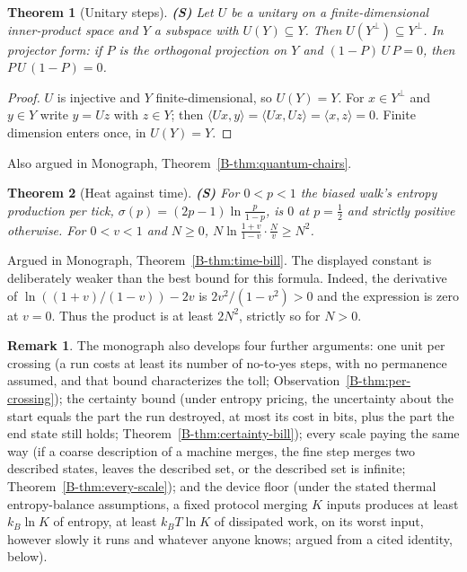 \documentclass[11pt, a4paper]{report}
\theoremstyle{definition}
\newtheorem{remark}{Remark}[chapter]
\theoremstyle{plain}
\newtheorem{theorem}{Theorem}[chapter]
\begin{document}
\begin{theorem}[Unitary steps] \textbf{(S)}
Let $U$ be a unitary on a finite-dimensional inner-product space and $Y$ a subspace with $U(Y) \subseteq Y$. Then $U(Y^\perp) \subseteq Y^\perp$. In projector form: if $P$ is the orthogonal projection on $Y$ and $(1 - P)\,U\,P = 0$, then $P\,U\,(1 - P) = 0$.
\end{theorem}
\begin{proof}
$U$ is injective and $Y$ finite-dimensional, so $U(Y) = Y$. For $x \in Y^\perp$ and $y \in Y$ write
$y = Uz$ with $z \in Y$; then $\langle Ux, y\rangle = \langle Ux, Uz\rangle = \langle x, z\rangle = 0$.
Finite dimension enters once, in $U(Y) = Y$.
\end{proof}
\noindent Also argued in Monograph, Theorem~\ref{B-thm:quantum-chairs}.

\begin{theorem}[Heat against time] \textbf{(S)}
For $0 < p < 1$ the biased walk's entropy production per tick, $\sigma(p) = (2p-1)\ln\frac{p}{1-p}$, is $0$ at $p = \tfrac12$ and strictly positive otherwise. For $0 < v < 1$ and $N \ge 0$, $N\ln\frac{1+v}{1-v} \cdot \frac{N}{v} \ge N^2$.
\end{theorem}
\noindent Argued in Monograph, Theorem~\ref{B-thm:time-bill}.
The displayed constant is deliberately weaker than the best bound for this
formula. Indeed, the derivative of
$\ln((1+v)/(1-v))-2v$ is $2v^2/(1-v^2)>0$ and the expression is zero
at $v=0$. Thus the product is at least $2N^2$, strictly so for $N>0$.


\begin{remark}
The monograph also develops four further arguments: one unit per crossing (a run costs at least its number of no-to-yes steps, with no permanence assumed, and that bound characterizes the toll; Observation~\ref{B-thm:per-crossing}); the certainty bound (under entropy pricing, the uncertainty about the start equals the part the run destroyed, at most its cost in bits, plus the part the end state still holds; Theorem~\ref{B-thm:certainty-bill}); every scale paying the same way (if a coarse description of a machine merges, the fine step merges two described states, leaves the described set, or the described set is infinite; Theorem~\ref{B-thm:every-scale}); and the device floor (under the stated thermal entropy-balance assumptions, a fixed protocol merging $K$ inputs produces at least $k_B\ln K$ of entropy, at least $k_B T\ln K$ of dissipated work, on its worst input, however slowly it runs and whatever anyone knows; argued from a cited identity, below).
\end{remark}
\end{document}

